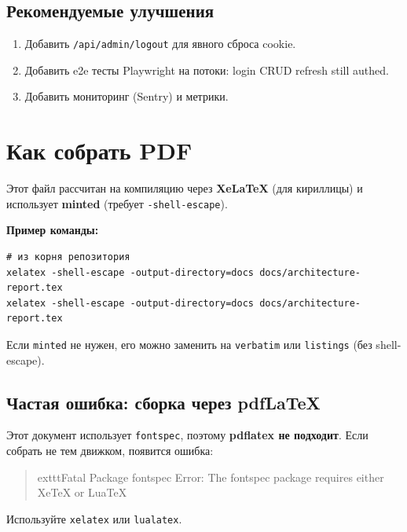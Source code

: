 \documentclass[12pt,a4paper]{article}
\begin{document}
\subsection{Рекомендуемые улучшения}
\begin{enumerate}[leftmargin=18pt]
  \item Добавить \texttt{/api/admin/logout} для явного сброса cookie.
  \item Добавить e2e тесты Playwright на потоки: login \textrightarrow CRUD \textrightarrow refresh \textrightarrow still authed.
  \item Добавить мониторинг (Sentry) и метрики.
\end{enumerate}

\section{Как собрать PDF}
Этот файл рассчитан на компиляцию через \textbf{XeLaTeX} (для кириллицы) и использует \textbf{minted} (требует \texttt{-shell-escape}).

\textbf{Пример команды:}
\begin{verbatim}
# из корня репозитория
xelatex -shell-escape -output-directory=docs docs/architecture-report.tex
xelatex -shell-escape -output-directory=docs docs/architecture-report.tex
\end{verbatim}

Если \texttt{minted} не нужен, его можно заменить на \texttt{verbatim} или \texttt{listings} (без shell-escape).

\subsection{Частая ошибка: сборка через pdfLaTeX}
Этот документ использует \texttt{fontspec}, поэтому \textbf{pdflatex не подходит}. Если собрать не тем движком, появится ошибка:
\begin{quote}
	exttt{Fatal Package fontspec Error: The fontspec package requires either XeTeX or LuaTeX}
\end{quote}
Используйте \texttt{xelatex} или \texttt{lualatex}.
\end{document}
